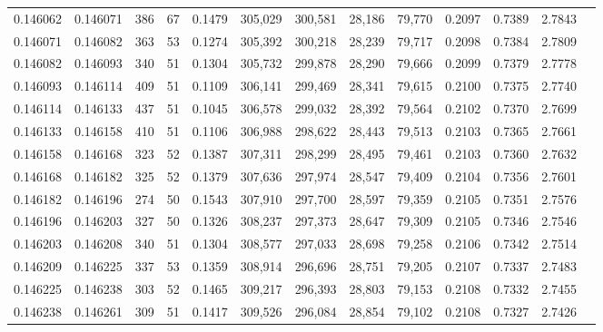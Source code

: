 \begin{tabular}{rrrrrrrrrrrrr}
0.146062 & 0.146071 &   386 &  67 &                                     0.1479 & 305,029 & 300,581 &  28,186 &  79,770 & 0.2097 & 0.7389 & 2.7843 \\
0.146071 & 0.146082 &   363 &  53 &                                     0.1274 & 305,392 & 300,218 &  28,239 &  79,717 & 0.2098 & 0.7384 & 2.7809 \\
0.146082 & 0.146093 &   340 &  51 &                                     0.1304 & 305,732 & 299,878 &  28,290 &  79,666 & 0.2099 & 0.7379 & 2.7778 \\
0.146093 & 0.146114 &   409 &  51 &                                     0.1109 & 306,141 & 299,469 &  28,341 &  79,615 & 0.2100 & 0.7375 & 2.7740 \\
0.146114 & 0.146133 &   437 &  51 &                                     0.1045 & 306,578 & 299,032 &  28,392 &  79,564 & 0.2102 & 0.7370 & 2.7699 \\
0.146133 & 0.146158 &   410 &  51 &                                     0.1106 & 306,988 & 298,622 &  28,443 &  79,513 & 0.2103 & 0.7365 & 2.7661 \\
0.146158 & 0.146168 &   323 &  52 &                                     0.1387 & 307,311 & 298,299 &  28,495 &  79,461 & 0.2103 & 0.7360 & 2.7632 \\
0.146168 & 0.146182 &   325 &  52 &                                     0.1379 & 307,636 & 297,974 &  28,547 &  79,409 & 0.2104 & 0.7356 & 2.7601 \\
0.146182 & 0.146196 &   274 &  50 &                                     0.1543 & 307,910 & 297,700 &  28,597 &  79,359 & 0.2105 & 0.7351 & 2.7576 \\
0.146196 & 0.146203 &   327 &  50 &                                     0.1326 & 308,237 & 297,373 &  28,647 &  79,309 & 0.2105 & 0.7346 & 2.7546 \\
0.146203 & 0.146208 &   340 &  51 &                                     0.1304 & 308,577 & 297,033 &  28,698 &  79,258 & 0.2106 & 0.7342 & 2.7514 \\
0.146209 & 0.146225 &   337 &  53 &                                     0.1359 & 308,914 & 296,696 &  28,751 &  79,205 & 0.2107 & 0.7337 & 2.7483 \\
0.146225 & 0.146238 &   303 &  52 &                                     0.1465 & 309,217 & 296,393 &  28,803 &  79,153 & 0.2108 & 0.7332 & 2.7455 \\
0.146238 & 0.146261 &   309 &  51 &                                     0.1417 & 309,526 & 296,084 &  28,854 &  79,102 & 0.2108 & 0.7327 & 2.7426 \\

\end{tabular}
